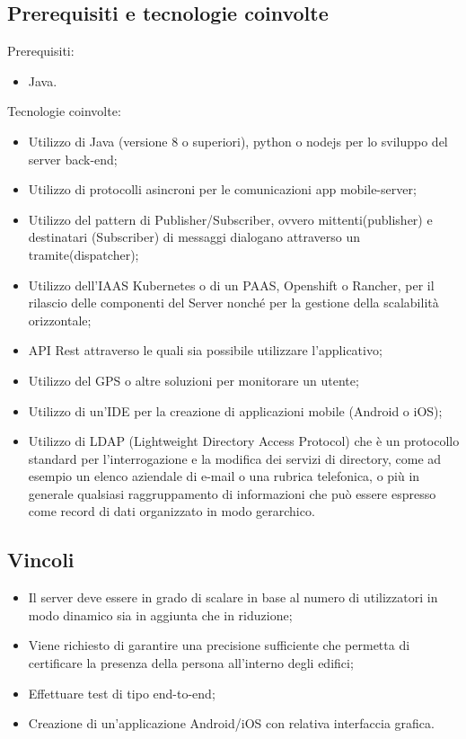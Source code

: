 \subsection{Prerequisiti e tecnologie coinvolte}
Prerequisiti:
\begin{itemize}
\item Java.
\end{itemize}
Tecnologie coinvolte:
\begin{itemize}
\item Utilizzo di Java (versione 8 o superiori), python o nodejs per lo sviluppo del server back-end;
\item Utilizzo di protocolli asincroni per le comunicazioni app mobile-server;
\item Utilizzo del pattern di Publisher/Subscriber, ovvero mittenti(publisher) e destinatari (Subscriber) di messaggi dialogano attraverso un tramite(dispatcher);
\item Utilizzo dell'IAAS Kubernetes o di un PAAS, Openshift o Rancher, per il rilascio delle componenti del Server nonch\'e per la gestione della scalabilit\`a orizzontale;
\item API Rest attraverso le quali sia possibile utilizzare l'applicativo;
\item Utilizzo del GPS o altre soluzioni per monitorare un utente;
\item Utilizzo di un'IDE per la creazione di applicazioni mobile (Android o iOS);
\item Utilizzo di LDAP (Lightweight Directory Access Protocol) che \`e un protocollo standard per l'interrogazione e la modifica dei servizi di directory, come ad esempio un elenco aziendale di e-mail o una rubrica telefonica, o pi\`u in generale qualsiasi raggruppamento di informazioni che pu\`o essere espresso come record di dati organizzato in modo gerarchico.
\end{itemize}

\subsection{Vincoli}
\begin{itemize}
\item Il server deve essere in grado di scalare in base al numero di utilizzatori in modo dinamico sia in aggiunta che in riduzione;
\item Viene richiesto di garantire una precisione sufficiente che permetta di certificare la presenza della persona all'interno degli edifici;
\item Effettuare test di tipo end-to-end;
\item Creazione di un'applicazione Android/iOS con relativa interfaccia grafica.
\end{itemize}

